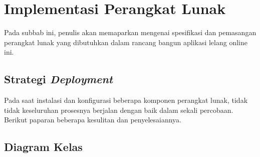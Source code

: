 
\section{Implementasi Perangkat Lunak}
Pada subbab ini, penulis akan memaparkan mengenai spesifikasi dan pemasangan perangkat lunak yang dibutuhkan dalam rancang bangun aplikasi lelang online ini.
  
  
\subsection{Strategi \textit{Deployment}}
Pada saat instalasi dan konfigurasi beberapa komponen perangkat lunak, tidak tidak keseluruhan prosesnya berjalan dengan baik dalam sekali percobaan. Berikut paparan beberapa kesulitan dan penyelesaiannya.
	  
	
%	
%	
%	
	
%	
%	
	
	
%	
	
	\subsection{Diagram Kelas}
	 
  
  
  
  
  
  
